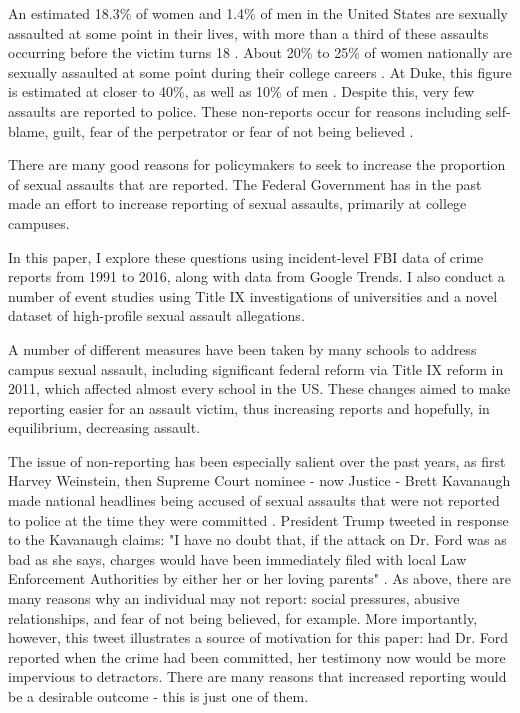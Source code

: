 \documentclass[AER,draftmode]{AEA}
\begin{document}

\clearpage
An estimated 18.3\% of women and 1.4\% of men in the United States are sexually assaulted at some point in their lives, with more than a third of these assaults occurring before the victim turns 18  \cite{black_national_2011}. About 20\% to 25\% of women nationally are sexually assaulted at some point during their college careers \cite{fisher_sexual_2000}. At Duke, this figure is estimated at closer to 40\%, as well as 10\% of men \cite{fox_university_2017}. Despite this, very few assaults are reported to police.  These non-reports occur for reasons including self-blame, guilt, fear of the perpetrator or fear of not being believed \cite{du_mont_role_2003}. 

There are many good reasons for policymakers to seek to increase the proportion of sexual assaults that are reported. 
The Federal Government has in the past made an effort to increase reporting of sexual assaults, primarily at college campuses. 

In this paper, I explore these questions using incident-level FBI data of crime reports from 1991 to 2016, along with data from Google Trends. I also conduct a number of event studies using Title IX investigations of universities and a novel dataset of high-profile sexual assault allegations. 

A number of different measures have been taken by many schools to address campus sexual assault, including significant federal reform via Title IX reform in 2011, which affected almost every school in the US. These changes aimed to make reporting easier for an assault victim, thus increasing reports and hopefully, in equilibrium, decreasing assault.

The issue of non-reporting has been especially salient over the past years, as first Harvey Weinstein, then Supreme Court nominee - now Justice - Brett Kavanaugh made national headlines being accused of sexual assaults that were not reported to police at the time they were committed . President Trump tweeted in response to the Kavanaugh claims: "I have no doubt that, if the attack on Dr. Ford was as bad as she says, charges would have been immediately filed with local Law Enforcement Authorities by either her or her loving parents" \citeyear{trump_i_2018}. As above, there are many reasons why an individual may not report: social pressures, abusive relationships, and fear of not being believed, for example. More importantly, however, this tweet illustrates a source of motivation for this paper: had Dr. Ford reported when the crime had been committed, her testimony now would be more impervious to detractors. There are many reasons that increased reporting would be a desirable outcome - this is just one of them. 
\end{document}
